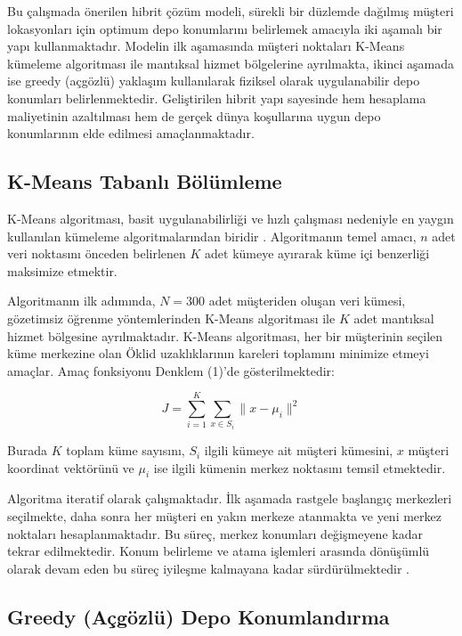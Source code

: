 \documentclass[conference]{IEEEtran}
\begin{document}
Bu çalışmada önerilen hibrit çözüm modeli, sürekli bir düzlemde dağılmış müşteri lokasyonları için optimum depo konumlarını belirlemek amacıyla iki aşamalı bir yapı kullanmaktadır. Modelin ilk aşamasında müşteri noktaları K-Means kümeleme algoritması ile mantıksal hizmet bölgelerine ayrılmakta, ikinci aşamada ise greedy (açgözlü) yaklaşım kullanılarak fiziksel olarak uygulanabilir depo konumları belirlenmektedir. Geliştirilen hibrit yapı sayesinde hem hesaplama maliyetinin azaltılması hem de gerçek dünya koşullarına uygun depo konumlarının elde edilmesi amaçlanmaktadır.

\subsection{K-Means Tabanlı Bölümleme}

K-Means algoritması, basit uygulanabilirliği ve hızlı çalışması nedeniyle en yaygın kullanılan kümeleme algoritmalarından biridir \cite{kmeans}. Algoritmanın temel amacı, $n$ adet veri noktasını önceden belirlenen $K$ adet kümeye ayırarak küme içi benzerliği maksimize etmektir.
 
Algoritmanın ilk adımında, $N = 300$ adet müşteriden oluşan veri kümesi, gözetimsiz öğrenme yöntemlerinden K-Means algoritması ile $K$ adet mantıksal hizmet bölgesine ayrılmaktadır. K-Means algoritması, her bir müşterinin seçilen küme merkezine olan Öklid uzaklıklarının kareleri toplamını minimize etmeyi amaçlar. Amaç fonksiyonu Denklem (1)'de gösterilmektedir:
 
\begin{equation}
J = \sum_{i=1}^{K} \sum_{x \in S_i} \|x - \mu_i\|^2
\end{equation}
 
Burada $K$ toplam küme sayısını, $S_i$ ilgili kümeye ait müşteri kümesini, $x$ müşteri koordinat vektörünü ve $\mu_i$ ise ilgili kümenin merkez noktasını temsil etmektedir.
 
Algoritma iteratif olarak çalışmaktadır. İlk aşamada rastgele başlangıç merkezleri seçilmekte, daha sonra her müşteri en yakın merkeze atanmakta ve yeni merkez noktaları hesaplanmaktadır. Bu süreç, merkez konumları değişmeyene kadar tekrar edilmektedir. Konum belirleme ve atama işlemleri arasında dönüşümlü olarak devam eden bu süreç iyileşme kalmayana kadar sürdürülmektedir \cite{salhi2003genetic}.

\subsection{Greedy (Açgözlü) Depo Konumlandırma}
\end{document}
